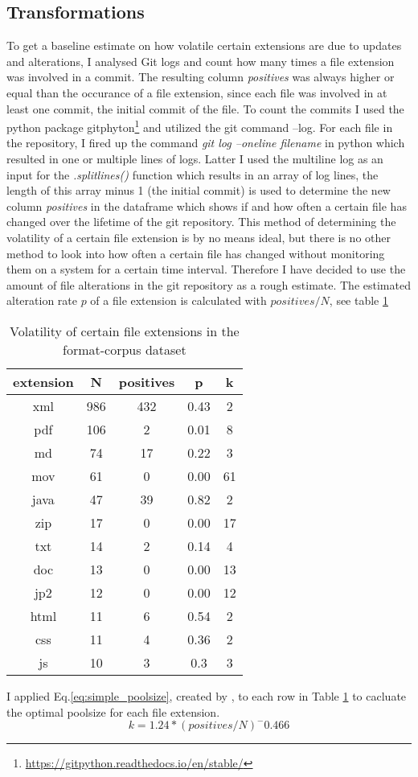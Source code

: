 \subsection{Transformations}
To get a baseline estimate on how volatile certain extensions are due to updates and alterations, I analysed Git logs and count how many times a file extension was involved in a commit. The resulting column \textit{positives} was always higher or equal than the occurance of a file extension, since each file was involved in at least one commit, the initial commit of the file. To count the commits I used the python package gitphyton\footnote{\url{https://gitpython.readthedocs.io/en/stable/}} and utilized the git command --log. For each file in the repository, I fired up the command \textit{git log --oneline filename} in python which resulted in one or multiple lines of logs. Latter I used the multiline log as an input for the \textit{.splitlines()} function which results in an array of log lines, the length of this array minus 1 (the initial commit) is used to determine the new column \textit{positives} in the dataframe which shows if and how often a certain file has changed over the lifetime of the git repository. 
This method of determining the volatility of a certain file extension is by no means ideal, but there is no other method to look into how often a certain file has changed without monitoring them on a system for a certain time interval. Therefore I have decided to use the amount of file alterations in the git repository as a rough estimate.
The estimated alteration rate $p$ of a file extension is calculated with $positives/N$, see table \ref{tb:git-alterations}
\begin{table}[ht]
    \caption{Volatility of certain file extensions in the format-corpus dataset}
    \centering
    \begin{tabular}{ c c c c c}
    \label{tb:git-alterations}
     extension & N & positives & p & k\\ 
     \hline
     xml & 986 & 432 & 0.43  & 2\\  
     \hline
     pdf &106 &2 &0.01  & 8\\
     \hline
     md & 74 & 17 & 0.22  & 3\\    
     \hline
     mov&61 & 0 & 0.00 &  61\\  
     \hline
     java &47 &39&0.82 & 2 \\  
     \hline
     zip & 17 &0 &0.00 &  17\\
     \hline
     txt & 14 & 2 & 0.14 &  4\\ 
     \hline
     doc & 13 & 0 & 0.00 &  13\\   
     \hline
     jp2 & 12 & 0 & 0.00 &  12\\    
     \hline
     html & 11 & 6 & 0.54 &  2\\   
     \hline
     css & 11 & 4 & 0.36 & 2 \\ 
     \hline
     js & 10 & 3 & 0.3 & 3
    \end{tabular}
\end{table}
I applied Eq.\ref{eq:simple_poolsize}, created by \cite{regen2020simple}, to each row in Table \ref{tb:git-alterations} to cacluate the optimal poolsize for each file extension.
\begin{equation}\label{eq:simple_poolsize}
    k = 1.24* (positives/N)^-0.466
\end{equation}



